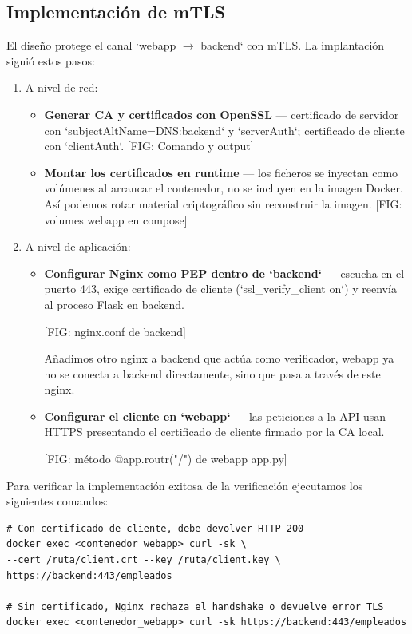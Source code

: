 \documentclass[11pt,spanish,listoffigures,listoftables]{tfgetsinf}
\begin{document}
        \subsection{Implementación de mTLS}
        \label{sec:5.3.3}
        El diseño protege el canal `webapp $\rightarrow$ backend` con mTLS. La implantación siguió estos pasos:
        \begin{enumerate}
            \item A nivel de red:
            \begin{itemize}
                \item \textbf{Generar CA y certificados con OpenSSL} — certificado de servidor con `subjectAltName=DNS:backend` y `serverAuth`; certificado de cliente con `clientAuth`.
                [FIG: Comando y output]
                \item \textbf{Montar los certificados en runtime} — los ficheros se inyectan como volúmenes al arrancar el contenedor, no se incluyen en la imagen Docker. Así podemos rotar material criptográfico sin reconstruir la imagen.
            [FIG: volumes webapp en compose]
            \end{itemize}
            
            \item A nivel de aplicación:
            \begin{itemize}
                \item \textbf{Configurar Nginx como PEP dentro de `backend`} — escucha en el puerto 443, exige certificado de cliente (`ssl\_verify\_client on`) y reenvía al proceso Flask en backend.
                
                [FIG: nginx.conf de backend]
                
                Añadimos otro nginx a backend que actúa como verificador, webapp ya no se conecta a backend directamente, sino que pasa a través de este nginx.
                
                \item \textbf{Configurar el cliente en `webapp`} — las peticiones a la API usan HTTPS presentando el certificado de cliente firmado por la CA local.

                [FIG: método @app.routr("/") de webapp app.py]
            \end{itemize}
        \end{enumerate}
        
        Para verificar la implementación exitosa de la verificación ejecutamos los siguientes comandos:
        \begin{lstlisting}
# Con certificado de cliente, debe devolver HTTP 200
docker exec <contenedor_webapp> curl -sk \
--cert /ruta/client.crt --key /ruta/client.key \
https://backend:443/empleados

# Sin certificado, Nginx rechaza el handshake o devuelve error TLS
docker exec <contenedor_webapp> curl -sk https://backend:443/empleados
        \end{lstlisting}
\end{document}
